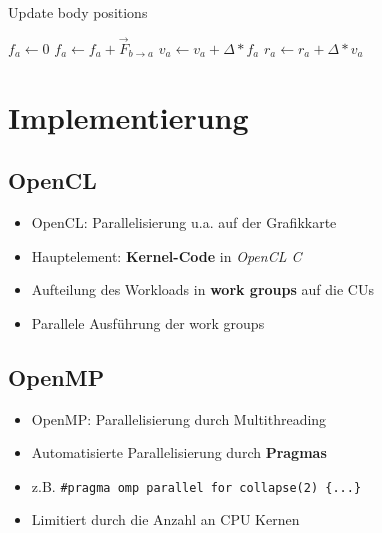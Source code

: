 \documentclass{beamer}
\begin{document}
\begin{frame}


\begin{algorithm}[H]
\caption{Update body positions}
\begin{algorithmic}[1]
      \State $f_a \gets 0$ 
        \State $f_a \gets f_a + \vec{F}^{\,}_{b\rightarrow a}$ 
      \EndFor
   \EndFor
      \State $v_a \gets v_a + \Delta * f_a$ 
      \State $r_a \gets r_a + \Delta * v_a$ 
   \EndFor
\EndProcedure
\end{algorithmic}
\end{algorithm}


\end{frame}

\section{Implementierung}

\subsection{OpenCL}
\begin{frame}
\begin{itemize}
  \item OpenCL: Parallelisierung u.a. auf der Grafikkarte
  \item Hauptelement: \textbf{Kernel-Code} in \textit{OpenCL C}
  \item Aufteilung des Workloads in \textbf{work groups} auf die CUs
  \item Parallele Ausführung der work groups
\end{itemize}
\end{frame}

\subsection{OpenMP}
\begin{frame}
\begin{itemize}
  \item OpenMP: Parallelisierung durch Multithreading
  \item Automatisierte Parallelisierung durch \textbf{Pragmas}
  \item z.B. \texttt{\#pragma omp parallel for collapse(2) \{...\}}
  \item Limitiert durch die Anzahl an CPU Kernen
\end{itemize}
\end{frame}
\end{document}
